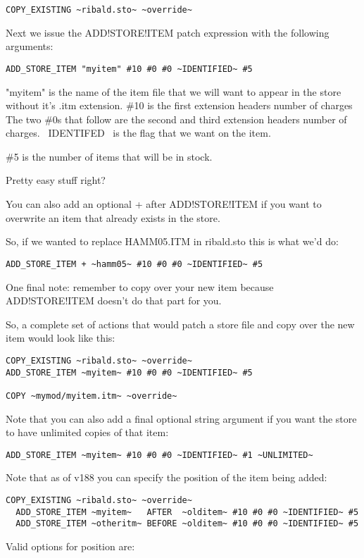 \documentclass{article}
\begin{document}
\begin{verbatim}
COPY_EXISTING ~ribald.sto~ ~override~
\end{verbatim}

  Next we issue the ADD!STORE!ITEM patch expression with the following
  arguments:

\begin{verbatim}
ADD_STORE_ITEM "myitem" #10 #0 #0 ~IDENTIFIED~ #5
\end{verbatim}

  "myitem" is the name of the item file that we will want to appear in the
  store without it's .itm extension.
  \#10 is the first extension headers number of charges
  The two \#0s that follow are the second and third extension headers number
  of charges.
  ~IDENTIFED~ is the flag that we want on the item.

  \#5 is the number of items that will be in stock.

  Pretty easy stuff right?

  You can also add an optional + after ADD!STORE!ITEM if you want to
  overwrite an item that already exists in the store.

  So, if we wanted to replace HAMM05.ITM in ribald.sto this is what we'd
  do:

\begin{verbatim}
ADD_STORE_ITEM + ~hamm05~ #10 #0 #0 ~IDENTIFIED~ #5
\end{verbatim}

  One final note: remember to copy over your new item because
  ADD!STORE!ITEM doesn't do that part for you.

  So, a complete set of actions that would patch a store file and copy over
  the new item would look like this:

\begin{verbatim}
COPY_EXISTING ~ribald.sto~ ~override~
ADD_STORE_ITEM ~myitem~ #10 #0 #0 ~IDENTIFIED~ #5

COPY ~mymod/myitem.itm~ ~override~
\end{verbatim}

  Note that you can also add a final optional string argument if you want
  the store to have unlimited copies of that item:

\begin{verbatim}
ADD_STORE_ITEM ~myitem~ #10 #0 #0 ~IDENTIFIED~ #1 ~UNLIMITED~
\end{verbatim}

Note that as of v188 you can specify the position of the item being added:
\begin{verbatim}
COPY_EXISTING ~ribald.sto~ ~override~
  ADD_STORE_ITEM ~myitem~   AFTER  ~olditem~ #10 #0 #0 ~IDENTIFIED~ #5
  ADD_STORE_ITEM ~otheritm~ BEFORE ~olditem~ #10 #0 #0 ~IDENTIFIED~ #5
\end{verbatim}
  Valid options for position are:
\end{document}
